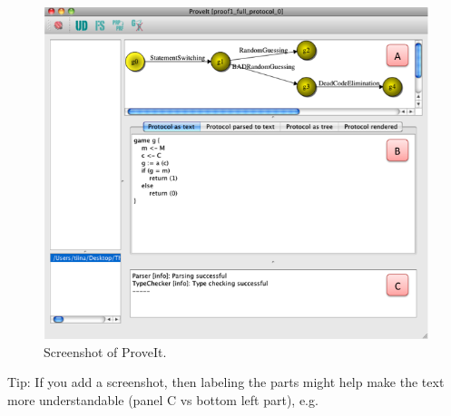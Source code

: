 \documentclass[estonian,english]{unitartucs-thesis} %
\newcommand{\proveit}{ProveIt\xspace}
\begin{document}
\begin{figure} [p]
\begin{center}
\includegraphics[width=\textwidth]{proveit_screenshot}
\caption{Screenshot of \proveit.}
\label{fig:proveit_screenshot}
\end{center}
\end{figure}

Tip: If you add a screenshot, then labeling the parts might help make the text more understandable (panel C vs bottom left part), e.g.
\end{document}

